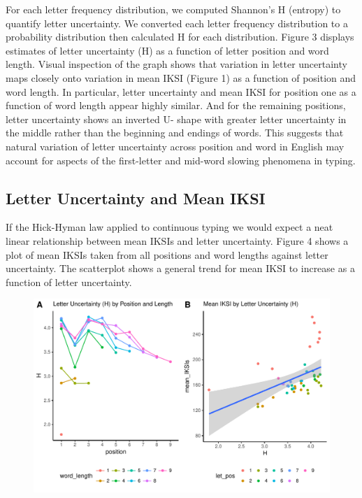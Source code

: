 \documentclass[floatsintext,man]{apa6}
\theoremstyle{definition}
\theoremstyle{definition}
\theoremstyle{definition}
\theoremstyle{remark}
\begin{document}
For each letter frequency distribution, we computed Shannon's H
(entropy) to quantify letter uncertainty. We converted each letter
frequency distribution to a probability distribution then calculated H
for each distribution. Figure 3 displays estimates of letter uncertainty
(H) as a function of letter position and word length. Visual inspection
of the graph shows that variation in letter uncertainty maps closely
onto variation in mean IKSI (Figure 1) as a function of position and
word length. In particular, letter uncertainty and mean IKSI for
position one as a function of word length appear highly similar. And for
the remaining positions, letter uncertainty shows an inverted U- shape
with greater letter uncertainty in the middle rather than the beginning
and endings of words. This suggests that natural variation of letter
uncertainty across position and word in English may account for aspects
of the first-letter and mid-word slowing phenomena in typing.

\subsection{Letter Uncertainty and Mean
IKSI}\label{letter-uncertainty-and-mean-iksi}

If the Hick-Hyman law applied to continuous typing we would expect a
neat linear relationship between mean IKSIs and letter uncertainty.
Figure 4 shows a plot of mean IKSIs taken from all positions and word
lengths against letter uncertainty. The scatterplot shows a general
trend for mean IKSI to increase as a function of letter uncertainty.

\begin{figure}
\centering
\includegraphics{Entropy_typing_draft_files/figure-latex/letter_uncertainty_by_IKSI-1.pdf}
\caption{}
\end{figure}
\end{document}
